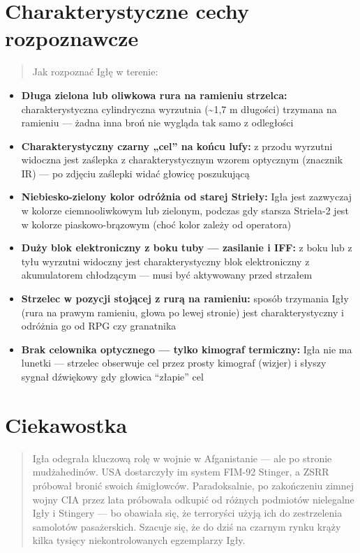 \documentclass[12pt,openany,oneside]{book}
\providecommand{\tightlist}{%
  \setlength{\itemsep}{0pt}\setlength{\parskip}{0pt}}
\begin{document}
\section{Charakterystyczne cechy
rozpoznawcze}\label{charakterystyczne-cechy-rozpoznawcze-32}

\begin{quote}
Jak rozpoznać Igłę w terenie:
\end{quote}

\begin{itemize}
\tightlist
\item
  \textbf{Długa zielona lub oliwkowa rura na ramieniu strzelca:}
  charakterystyczna cylindryczna wyrzutnia (\textasciitilde1,7 m
  długości) trzymana na ramieniu --- żadna inna broń nie wygląda tak
  samo z odległości
\item
  \textbf{Charakterystyczny czarny „cel'' na końcu lufy:} z przodu
  wyrzutni widoczna jest zaślepka z charakterystycznym wzorem optycznym
  (znacznik IR) --- po zdjęciu zaślepki widać głowicę poszukującą
\item
  \textbf{Niebiesko-zielony kolor odróżnia od starej Strieły:} Igła jest
  zazwyczaj w kolorze ciemnooliwkowym lub zielonym, podczas gdy starsza
  Strieła-2 jest w kolorze piaskowo-brązowym (choć kolor zależy od
  operatora)
\item
  \textbf{Duży blok elektroniczny z boku tuby --- zasilanie i IFF:} z
  boku lub z tyłu wyrzutni widoczny jest charakterystyczny blok
  elektroniczny z akumulatorem chłodzącym --- musi być aktywowany przed
  strzałem
\item
  \textbf{Strzelec w pozycji stojącej z rurą na ramieniu:} sposób
  trzymania Igły (rura na prawym ramieniu, głowa po lewej stronie) jest
  charakterystyczny i odróżnia go od RPG czy granatnika
\item
  \textbf{Brak celownika optycznego --- tylko kimograf termiczny:} Igła
  nie ma lunetki --- strzelec obserwuje cel przez prosty kimograf
  (wizjer) i słyszy sygnał dźwiękowy gdy głowica ``złapie'' cel
\end{itemize}

\section{Ciekawostka}\label{ciekawostka-32}

\begin{quote}
Igła odegrała kluczową rolę w wojnie w Afganistanie --- ale po stronie
mudżahedinów. USA dostarczyły im system FIM-92 Stinger, a ZSRR próbował
bronić swoich śmigłowców. Paradoksalnie, po zakończeniu zimnej wojny CIA
przez lata próbowała odkupić od różnych podmiotów nielegalne Igły i
Stingery --- bo obawiała się, że terroryści użyją ich do zestrzelenia
samolotów pasażerskich. Szacuje się, że do dziś na czarnym rynku krąży
kilka tysięcy niekontrolowanych egzemplarzy Igły.
\end{quote}
\end{document}
